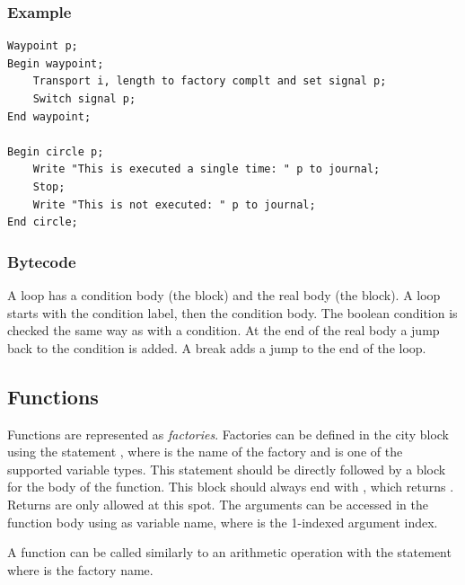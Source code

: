 \subsubsection*{Example}

\begin{lstlisting}
Waypoint p;
Begin waypoint;
	Transport i, length to factory complt and set signal p;
	Switch signal p;
End waypoint;

Begin circle p;
	Write "This is executed a single time: " p to journal;
	Stop;
	Write "This is not executed: " p to journal;
End circle;
\end{lstlisting}

\subsubsection*{Bytecode}

A loop has a condition body (the  block) and the real body (the  block). A loop starts with the condition label, then the condition body. The boolean condition is checked the same way as with a condition. At the end of the real body a jump back to the condition is added. A break adds a jump to the end of the loop.

\subsection{Functions}

Functions are represented as \emph{factories}. Factories can be defined in the  city block using the statement , where  is the name of the factory and  is one of the supported variable types. This statement should be directly followed by a  block for the body of the function. This block should always end with , which returns . Returns are only allowed at this spot. The arguments can be accessed in the function body using  as variable name, where  is the 1-indexed argument index.

A function can be called similarly to an arithmetic operation with the  statement where  is the factory name.

